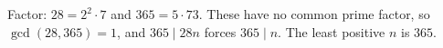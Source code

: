 Factor: $28=2^2\cdot7$ and $365=5\cdot73$. These have no common prime factor, so $\gcd(28,365)=1$, and $365\mid28n$ forces $365\mid n$. The least positive $n$ is $\boxed{365}$.
